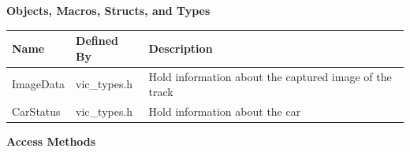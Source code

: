 \documentclass [10pt]{article}
\begin{document}
\textbf{Objects, Macros, Structs, and Types}\\ 
\begin{longtable}{ |p{ }  p{ } p{}|} \hline

\textbf{Name} & \textbf{Defined By} & \textbf{Description} \\ \hline

\rowcolor{tableCell}  ImageData & vic\_types.h &  Hold  information about the captured image of the track \\ \hline
 CarStatus & vic\_types.h & Hold information about the car  \\ \hline


\end{longtable}



 





 


\textbf{Access Methods} \\ 
\end{document}
